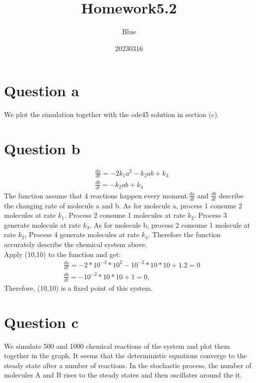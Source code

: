 \documentclass{article}
\title{Homework5.2}
\author{Blue}
\date{20230316}
\begin{document}
\maketitle
\section{Question a}
We plot the simulation together with the ode45 solution in section (c).


\section{Question b}
\begin{align}
&\frac{da}{dt}=-2k_1a^2-k_2ab+k_3\\
&\frac{db}{dt}=-k_2ab+k_4
\end{align}
The function assume that 4 reactions happen every moment.$\frac{da}{dt}$ and $\frac{db}{dt}$ describe the changing rate of molecule a and b. As for molecule a, process 1 consume 2 molecules at rate $k_1$. Process 2 consume 1 molecules at rate $k_2$. Process 3 generate molecule at rate $k_3$. As for molecule b, process 2 consume 1 molecule at rate $k_2$, Process 4 generate molecules at rate $k_4$. Therefore the function accurately describe the chemical system above.\\
Apply (10,10) to the function and get:
\begin{align}
&\frac{da}{dt}=-2*10^{-3}*10^{2}-10^{-2}*10*10+1.2=0\\
&\frac{db}{dt}=-10^{-2}*10*10+1=0.
\end{align}
Therefore, (10,10) is a fixed point of this system.
\section{Question c}
We simulate 500 and 1000 chemical reactions of the system and plot them together in the graph. It seems that the deterministic equations converge to the steady state after a number of reactions. In the stochastic process, the number of molecules A and B rises to the steady states and then oscillates around the it.
\end{document}
